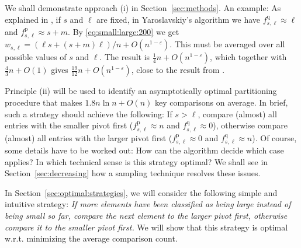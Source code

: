 \documentclass[prodmode,acmtalg]{acmsmall}
\begin{document}
We shall demonstrate approach (i) in Section~\ref{sec:methods}. An example: 
As explained in \cite{nebel12}, if $s$ and $\ell$ are fixed,  
in Yaroslavskiy's algorithm we have $f^\text{q}_{s,\ell} \approx \ell$ and $f^\text{p}_{s,\ell} \approx s+m$. 
By \eqref{eq:small:large:200} we get $w_{s,\ell} = (\ell s + (s+m) \ell)/n + O(n^{1 - \varepsilon})$.
This must be averaged over all possible values of $s$ and $\ell$. The result is
$\frac{1}{4}n + O(n^{1 - \varepsilon})$,
which together with $\frac{4}{3}n + O(1)$ gives $\frac{19}{12}n + O(n^{1 - \varepsilon})$, close
to the result  from \cite{nebel12}. 

Principle (ii) will be used to identify an asymptotically optimal partitioning procedure 
that makes $1.8n \ln n + O(n)$
key comparisons on average. 
In brief, such a strategy should achieve the following: 
	If $s>\ell$, compare (almost) all entries with the smaller pivot first ($f^\text{p}_{s,\ell}
	\approx n$ and $f^\text{q}_{s,\ell}\approx 0$),
	otherwise compare (almost) all entries with the larger pivot first
	($f^\text{p}_{s,\ell}\approx 0$ and $f^\text{q}_{s,\ell}\approx n$). 
	Of course, some details have to be worked out:
	How can the algorithm decide which case applies? In which technical sense is this strategy optimal?
	We shall see in Section~\ref{sec:decreasing} how a sampling technique resolves these issues.
	

        In 
Section~\ref{sec:optimal:strategies}, we will consider the following simple and intuitive strategy:
\emph{If more elements have been classified as being large instead of being small so far,
compare the next element to the larger pivot first, otherwise compare it to the smaller
pivot first.}
We will show
that this strategy is optimal w.r.t. minimizing the average comparison count.
\end{document}
